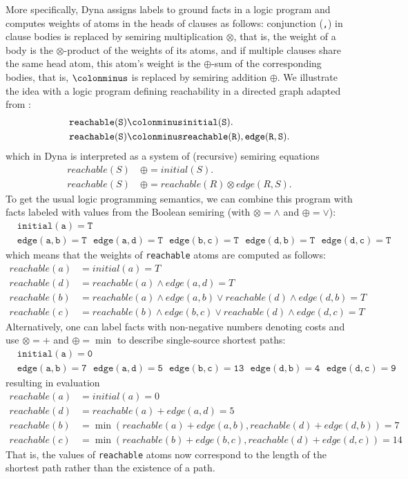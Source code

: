 \documentclass[a4paper]{article}
\begin{document}
More specifically, Dyna assigns labels to ground facts in a logic
program and computes weights of atoms in the heads of clauses as
follows: conjunction (\verb|,|) in clause bodies is replaced by
semiring multiplication $\otimes$, that is, the weight of a body is
the $\otimes$-product of the weights of its atoms, and if multiple
clauses share the same head atom, this atom's weight is the
$\oplus$-sum of the corresponding bodies, that is, $\colonminus$ is
replaced by semiring addition $\oplus$. 
We illustrate the idea with a logic program defining reachability in a
directed graph adapted from \cite{cohen:iclp08}:
\begin{align*}
\mathtt{reachable(S)}&\colonminus\mathtt{initial(S)}.\\
\mathtt{reachable(S)}&\colonminus\mathtt{reachable(R),edge(R,S)}.
\end{align*}
which in Dyna is interpreted as a system of (recursive) semiring equations
\begin{align*}
reachable(S) ~&\oplus= initial(S).\\
reachable(S) ~&\oplus= reachable(R) \otimes edge(R,S).
\end{align*}
To get the usual logic programming semantics, we can combine this program with facts labeled  with values from
the Boolean semiring (with $\otimes = \wedge$ and $\oplus = \vee$):
\begin{align*}
&\mathtt{initial(a)=T}\\
&\mathtt{edge(a,b)=T ~~~ edge(a,d)=T  ~~~ edge(b,c)=T ~~~ edge(d,b)=T ~~~ edge(d,c)=T}
\end{align*}
which means that the weights of \verb|reachable| atoms are computed as follows:
\begin{align*}
reachable(a) &= initial(a) = T\\
reachable(d) & = reachable(a)\wedge edge(a,d) = T\\
reachable(b) &= reachable(a) \wedge edge(a,b) \vee reachable(d)\wedge
edge(d,b) =  T\\
reachable(c) &= reachable(b)\wedge edge(b,c) \vee reachable(d)\wedge
edge(d,c) = T
\end{align*}
Alternatively, one can label facts with non-negative numbers denoting costs and use $\otimes = +$
and $\oplus = \min$ to describe single-source shortest paths:
\begin{align*}
&\mathtt{initial(a)=0}\\
&\mathtt{edge(a,b)=7 ~~~ edge(a,d)=5  ~~~ edge(b,c)=13 ~~~ edge(d,b)=4 ~~~ edge(d,c)=9}
\end{align*}
resulting in evaluation
\begin{align*}
reachable(a) &= initial(a) = 0\\
reachable(d) & = reachable(a) + edge(a,d) = 5\\
reachable(b) &= \min( reachable(a) + edge(a,b) , reachable(d) + 
edge(d,b)) =  7\\
reachable(c) &= \min( reachable(b)+ edge(b,c) , reachable(d) +
edge(d,c)) = 14
\end{align*}
That is, the values of \verb|reachable| atoms now correspond to the
length of the shortest path rather than the existence of a path. 
\end{document}
